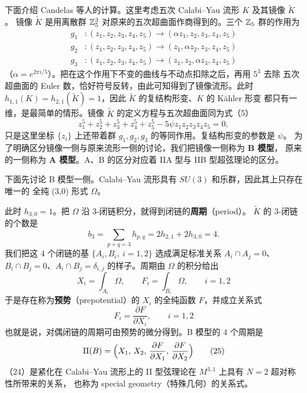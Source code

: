 下面介绍 Candelas 等人的计算。这里考虑五次 Calabi--Yau 流形 $K$ 及其镜像 $\tilde K$。
镜像 $\tilde K$ 是用离散群 $\mathbb{Z}_5^3$ 对原来的五次超曲面作商得到的。三个 $\mathbb{Z}_5$ 群的作用为
\begin{equation*}
  \begin{aligned}
    g_1&:(z_1,z_2,z_3,z_4,z_5)\longrightarrow(\alpha z_1,z_2,z_3,z_4,z_5)\\
    g_2&:(z_1,z_2,z_3,z_4,z_5)\longrightarrow(z_1,\alpha z_2,z_3,z_4,z_5)\\
    g_3&:(z_1,z_2,z_3,z_4,z_5)\longrightarrow(z_1,z_2,\alpha z_3,z_4,z_5)
  \end{aligned}
\end{equation*}
（$\alpha=e^{2\pi i/5}$）。把在这个作用下不变的曲线与不动点扣除之后，再用 $5^3$ 去除
五次超曲面的 Euler 数，恰好符号反转，由此可知得到了镜像流形。此时
$h_{1,1}(K)=h_{2,1}(\tilde K)=1$，因此 $\tilde K$ 的复结构形变、$K$ 的 Kähler 形变
都只有一维，是最简单的情形。镜像 $\tilde K$ 的定义方程与五次超曲面同为式（5）
\[
  z_1^5+z_2^5+z_3^5+z_4^5+z_5^5-5\psi z_1z_2z_3z_4z_5=0,
\]
只是这里坐标 $\{z_i\}$ 上还带着群 $g_1,g_2,g_3$ 的等同作用。复结构形变的参数是 $\psi$。
为了明确区分镜像一侧与原来流形一侧的讨论，我们把镜像一侧称为 \textbf{B 模型}，
原来的一侧称为 \textbf{A 模型}。A、B 的区分对应着 IIA 型与 IIB 型超弦理论的区分。

下面先讨论 B 模型一侧。Calabi--Yau 流形具有 $SU(3)$ 和乐群，因此其上只存在唯一的
全纯 (3,0) 形式 $\Omega$。

此时 $h_{3,0}=1$。把 $\Omega$ 沿 3-闭链积分，就得到闭链的\textbf{周期}（period）。
$\tilde K$ 的 3-闭链的个数是
\[
  b_3=\sum_{p+q=3}h_{p,q}=2h_{2,1}+2h_{3,0}=4 .
\]
我们把这 4 个闭链的基 $\{A_i,B_i,\ i=1,2\}$ 选成满足标准关系 $A_i\cap A_j=0$、
$B_i\cap B_j=0$、$A_i\cap B_j=\delta_{i,j}$ 的样子。周期由 $\Omega$ 的积分给出
\begin{equation}
  X_i=\int_{A_i}\Omega,\qquad F_i=\int_{B_i}\Omega,\qquad i=1,2 \tag{23}
\end{equation}
于是存在称为\textbf{预势}（prepotential）的 $X_i$ 的全纯函数 $F$，并成立关系式
\begin{equation}
  F_i=\frac{\partial F}{\partial X_i},\qquad i=1,2 \tag{24}
\end{equation}
也就是说，对偶闭链的周期可由预势的微分得到。B 模型的 4 个周期是
\begin{equation}
  \Pi(B)=\Bigl(X_1,\,X_2,\,\frac{\partial F}{\partial X_1},\,\frac{\partial F}{\partial X_2}\Bigr) \tag{25}
\end{equation}
（24）是紧化在 Calabi--Yau 流形上的 II 型弦理论在 $M^{3,1}$ 上具有 $N=2$ 超对称性所带来的关系，
也称为 special geometry（特殊几何）的关系式。

